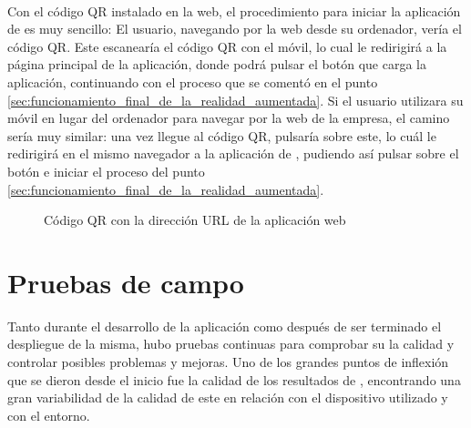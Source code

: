 \documentclass{subfiles}
\begin{document}
    \paragraph{}
    Con el código QR instalado en la web, el procedimiento para iniciar la aplicación de \ra es muy sencillo: El usuario, navegando por la web desde su ordenador, vería el código QR. Este escanearía el código QR con el móvil, lo cual le redirigirá a la página principal de la aplicación, donde podrá pulsar el botón que carga la aplicación, continuando con el proceso que se comentó en el punto \ref{sec:funcionamiento_final_de_la_realidad_aumentada}. Si el usuario utilizara su móvil en lugar del ordenador para navegar por la web de la empresa, el camino sería muy similar: una vez llegue al código QR, pulsaría sobre este, lo cuál le redirigirá en el mismo navegador a la aplicación de \ra, pudiendo así pulsar sobre el botón e iniciar el proceso del punto \ref{sec:funcionamiento_final_de_la_realidad_aumentada}.

    \begin{figure}[H]
    \centering
    \caption{Código QR con la dirección URL de la aplicación web}
    \label{fig:5.1_qr_actualizado}
    \end{figure}

    \section{Pruebas de campo}
    \label{sec:pruebas_de_campo}
    Tanto durante el desarrollo de la aplicación como después de ser terminado el despliegue de la misma, hubo pruebas continuas para comprobar su la calidad y controlar posibles problemas y mejoras. Uno de los grandes puntos de inflexión que se dieron desde el inicio fue la calidad de los resultados de \hittest, encontrando una gran variabilidad de la calidad de este en relación con el dispositivo utilizado y con el entorno.
\end{document}
